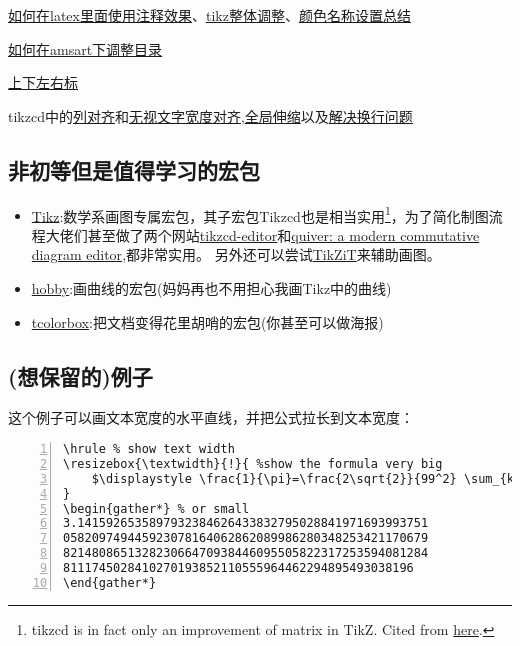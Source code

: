 \documentclass[11pt]{amsart}
\begin{document}
\href{https://liam.page/2016/09/24/TikZ-comment-to-text/}{如何在latex里面使用注释效果}、\href{https://newbedev.com/how-of-to-change-font-size-for-every-nodes-in-tikzcd}{tikz整体调整}、\href{http://latexcolor.com/}{颜色名称设置总结}

\href{https://tex.stackexchange.com/questions/322268/table-of-contents-amsart}{如何在amsart下调整目录}

\href{https://tex.stackexchange.com/questions/11542/left-and-right-subscript-superscript}{上下左右标}

tikzcd中的\href{https://tex.stackexchange.com/questions/289295/column-alignment-in-tikzcd}{列对齐}和\href{https://tex.stackexchange.com/questions/411742/tikzcd-how-to-get-even-column-spacing}{无视文字宽度对齐},\href{https://tex.stackexchange.com/questions/325297/how-to-scale-a-tikzcd-diagram}{全局伸缩}以及\href{https://tex.stackexchange.com/questions/84945/adjustbox-ate-my-newlines}{解决换行问题}
\subsection{非初等但是值得学习的宏包}
\begin{itemize}
\item \href{https://ctan.org/pkg/pgf}{Tikz}:数学系画图专属宏包，其子宏包Tikzcd也是相当实用\footnote{tikzcd is in fact only an improvement of matrix in TikZ. Cited from \href{https://tex.stackexchange.com/questions/484743/format-single-node-in-tikzcd}{here}.}，为了简化制图流程大佬们甚至做了两个网站\href{https://tikzcd.yichuanshen.de/}{tikzcd-editor}和\href{https://q.uiver.app/}{quiver: a modern commutative diagram editor},都非常实用。 另外还可以尝试\href{https://tikzit.github.io/}{TikZiT}来辅助画图。
\item \href{https://ctan.org/pkg/hobby}{hobby}:画曲线的宏包(妈妈再也不用担心我画Tikz中的曲线)
\item \href{https://ctan.org/pkg/tcolorbox}{tcolorbox}:把文档变得花里胡哨的宏包(你甚至可以做海报)
\end{itemize}
\subsection{(想保留的)例子}
这个例子可以画文本宽度的水平直线，并把公式拉长到文本宽度：
\begin{lstlisting}[numbers=left,numberstyle=\tiny,numbersep=10pt]
\hrule % show text width
\resizebox{\textwidth}{!}{ %show the formula very big
	$\displaystyle \frac{1}{\pi}=\frac{2\sqrt{2}}{99^2} \sum_{k=0}^{\infty} \frac{(4k)!}{k!^4}\frac{26390k+1103}{396^{4k}} $
}
\begin{gather*} % or small
3.1415926535897932384626433832795028841971693993751
058209749445923078164062862089986280348253421170679
821480865132823066470938446095505822317253594081284
8111745028410270193852110555964462294895493038196
\end{gather*}
\end{lstlisting}
\end{document}
